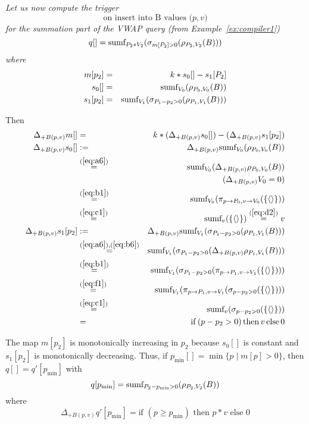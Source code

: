 \begin{example}\em
Let us now compute the trigger
\[
\mbox{on insert into B values ($p, v$)}
\]
for the summation part of the VWAP query (from Example~\ref{ex:compiler1})
\[
q[] = \mbox{sumf}_{P_2 * V_2}(\sigma_{m[P_2] > 0}(\rho_{P_2, V_2}(B)))
\]
where
\begin{eqnarray*}
m[p_2]   &=& k * s_0[] - s_1[P_2]
\\
s_0[]    &=& \mbox{sumf}_{V_0}(\rho_{P_0, V_0}(B))
\\
s_1[p_2] &=& \mbox{sumf}_{V_1}(\sigma_{P_1 - p_2 > 0}(\rho_{P_1, V_1}(B)))
\end{eqnarray*}

Then
\begin{eqnarray*}
\Delta_{+B(p,v)} m[] &=& k * 
(\Delta_{+B(p,v)} s_0[]) - (\Delta_{+B(p,v)} s_1[p_2]) 
\\
\Delta_{+B(p,v)} s_0[] &:=&
   \Delta_{+B(p,v)} \mbox{sumf}_{V_0}(\rho_{P_0, V_0}(B))
\\
&\stackrel{(\ref{eq:a6})}{=}& 
   \mbox{sumf}_{V_0}(\Delta_{+B(p,v)} \rho_{P_0, V_0}(B))
\\
&& \quad (\Delta_{+B(p,v)} V_0 = 0)
\\
&\stackrel{(\ref{eq:b1})}{=}& \mbox{sumf}_{V_0}(\pi_{p \rightarrow P_0, v \rightarrow V_0}(\{{\langle\rangle}\}))
\\
&\stackrel{(\ref{eq:c1})}{=}& \mbox{sumf}_v(\{{\langle\rangle}\})
\stackrel{(\ref{eq:d2})}{=}
v
\\
\Delta_{+B(p,v)} s_1[p_2] &:=&
   \Delta_{+B(p,v)} \mbox{sumf}_{V_1}(\sigma_{P_1 - p_2 > 0}(\rho_{P_1, V_1}(B)))
\\
&\stackrel{(\ref{eq:a6}), (\ref{eq:b6})}{=}&
\mbox{sumf}_{V_1}(\sigma_{P_1 - p_2 > 0}(\Delta_{+B(p,v)} \rho_{P_1, V_1}(B)))
\\
&\stackrel{(\ref{eq:b1})}{=}&
\mbox{sumf}_{V_1}(\sigma_{P_1 - p_2 > 0}(\pi_{p \rightarrow P_1, v \rightarrow V_1}(\{{\langle\rangle}\})))
\\
&\stackrel{(\ref{eq:f1})}{=}&
\mbox{sumf}_{V_1}(\pi_{p \rightarrow P_1, v \rightarrow V_1}(\sigma_{p - p_2 > 0}(\{{\langle\rangle}\})))
\\
&\stackrel{(\ref{eq:c1})}{=}&
\mbox{sumf}_{v}(\sigma_{p - p_2 > 0}(\{{\langle\rangle}\}))
\\
&=& \mathrm{if}\, (p - p_2 > 0) \, \mathrm{then}\, v \, \mathrm{else} \, 0
\end{eqnarray*}

The map $m[p_2]$ is monotonically increasing in $p_2$ because $s_0[]$ is
constant and $s_1[p_2]$ is monotonically decreasing. Thus, if
$p_{\min}[] = \min \{ p \mid m[p] > 0 \}$, then
$q[] = q'[p_{\min}]$ with
\[
q[p_{\min}] = \mbox{sumf}_{P_2 - p_{\min} > 0}(\rho_{P_2,V_2}(B))
\]
where
\[
\Delta_{+B(p,v)} q'[p_{\min}] =
   \mbox{if $(p \ge p_{\min})$ then $p * v$ else $0$}
\]


\end{example}
